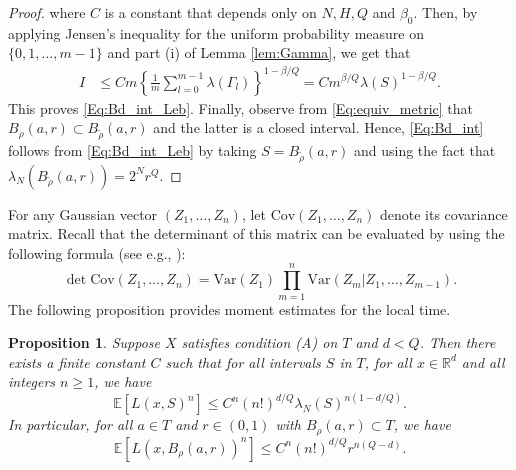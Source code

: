 \documentclass[11pt, reqno]{amsart}
\newtheorem{proposition}[theorem]{Proposition}
\def\R{{\mathbb R}}
\def\E{{\mathbb E}}
\numberwithin{equation}{section}
\begin{document}
\begin{proof}
where $C$ is a constant that depends only on $N, H, Q$ and $\beta_0$. Then, by applying Jensen's inequality for the uniform 
probability measure on $\{0, 1, \dots, m-1\}$ and part (i) of Lemma \ref{lem:Gamma}, we get that
\begin{align*}
I & \le C m \left\{ \frac{1}{m} \sum_{l=0}^{m-1} \lambda(\Gamma_l) \right\}^{1-\beta/Q} = C m^{\beta/Q} \lambda(S)^{1-\beta/Q}.
\end{align*}
This proves \eqref{Eq:Bd_int_Leb}.
Finally, observe from \eqref{Eq:equiv_metric} that $B_\rho(a, r) \subset B_{\tilde\rho}(a, r)$ and the latter is a closed interval.
Hence, \eqref{Eq:Bd_int} follows from \eqref{Eq:Bd_int_Leb} by taking $S =  B_{\tilde\rho}(a, r)$ and using the fact that 
$\lambda_N(B_{\tilde\rho}(a, r)) = 2^N r^Q$.
\end{proof}

For any Gaussian vector $(Z_1, \dots, Z_n)$, let $\mathrm{Cov}(Z_1, \dots, Z_n)$ denote its covariance matrix. Recall that 
the determinant of this matrix can be evaluated by using the following formula (see e.g., \cite[Corollary A.2]{KM20}):
\begin{equation}\label{Eq:Cov_formula}
\det \mathrm{Cov}(Z_1, \dots, Z_n) = \mathrm{Var}(Z_1) \prod_{m=1}^n \mathrm{Var}(Z_m|Z_1, \dots, Z_{m-1}).
\end{equation}
The following proposition provides moment estimates for the local time.  

\begin{proposition}\label{Prop:mom_LT}
Suppose $X$ satisfies condition \textup{(A)} on $T$ and $d < Q$.  Then there exists a finite constant $C$ such that for all 
intervals $S$ in $T$, for all $x \in \R^d$ 
and all integers $n \ge 1$, we have%
\[ \E[L(x, S)^n] \le C^n (n!)^{d/Q} \lambda_N(S)^{n(1-d/Q)}. \]
In particular, for all $a \in T$ and $r \in (0, 1)$ with $B_\rho(a, r) \subset T$, we have
\[ \E[L(x, B_\rho(a, r))^n] \le C^n (n!)^{d/Q} r^{n(Q-d)}. \]
\end{proposition}
\end{document}
